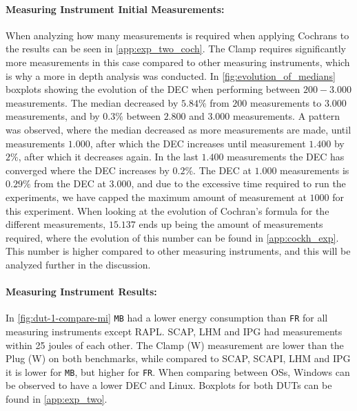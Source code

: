 \paragraph{Measuring Instrument Initial Measurements:} When analyzing how many measurements is required when applying Cochrans to the results can be seen in \cref{app:exp_two_coch}. %
The Clamp requires significantly more measurements in this case compared to other measuring instruments, which is why a more in depth analysis was conducted. In \cref{fig:evolution_of_medians} boxplots showing the evolution of the DEC when performing between $200-3.000$ measurements. The median decreased by $5.84\%$ from $200$ measurements to $3.000$ measurements, and by $0.3\%$ between $2.800$ and $3.000$ measurements. A pattern was observed, where the median decreased as more measurements are made, until measurements $1.000$, after which the DEC increases until measurement $1.400$ by $2\%$, after which it decreases again. In the last $1.400$ measurements the DEC has converged where the DEC increases by $0.2\%$. The DEC at $1.000$ measurements is $0.29\%$ from the DEC at $3.000$, and due to the excessive time required to run the experiments, we have capped the maximum amount of measurement at $1000$ for this experiment. When looking at the evolution of Cochran's formula for the different measurements, $15.137$ ends up being the amount of measurements required, where the evolution of this number can be found in \cref{app:cockh_exp}. This number is higher compared to other measuring instruments, and this will be analyzed further in the discussion.


\paragraph{Measuring Instrument Results:} %
In \cref{fig:dut-1-compare-mi} \texttt{MB} had a lower energy consumption than \texttt{FR} for all measuring instruments except RAPL. SCAP, LHM and IPG had measurements within 25 joules of each other. The Clamp (W) measurement are lower than the Plug (W) on both benchmarks, while compared to SCAP, SCAPI, LHM and IPG it is lower for \texttt{MB}, but higher for \texttt{FR}. When comparing between OSs, Windows can be observed to have a lower DEC and Linux. Boxplots for both DUTs can be found in \cref{app:exp_two}.



